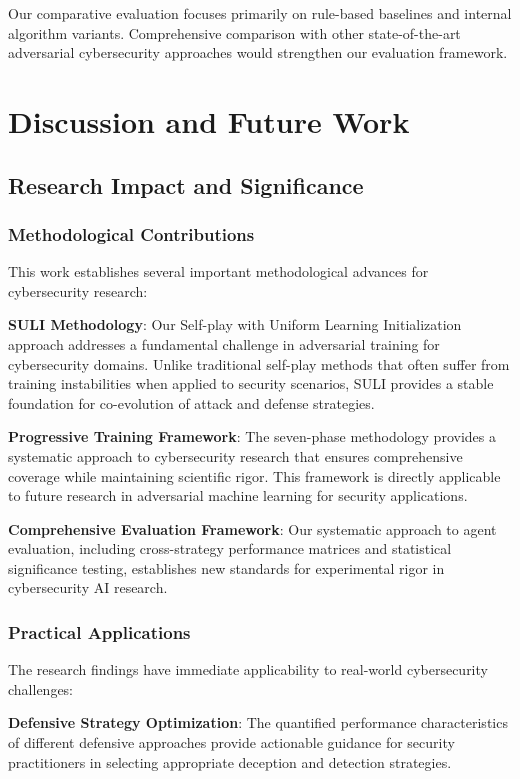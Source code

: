 \documentclass[11pt]{article}
\newcounter{phase}[algorithm]
\theoremstyle{definition}
\theoremstyle{plain}
\begin{document}
Our comparative evaluation focuses primarily on rule-based baselines and internal algorithm variants. Comprehensive comparison with other state-of-the-art adversarial cybersecurity approaches would strengthen our evaluation framework.

\section{Discussion and Future Work}

\subsection{Research Impact and Significance}

\subsubsection{Methodological Contributions}
This work establishes several important methodological advances for cybersecurity research:

\textbf{SULI Methodology}: Our Self-play with Uniform Learning Initialization approach addresses a fundamental challenge in adversarial training for cybersecurity domains. Unlike traditional self-play methods that often suffer from training instabilities when applied to security scenarios, SULI provides a stable foundation for co-evolution of attack and defense strategies.

\textbf{Progressive Training Framework}: The seven-phase methodology provides a systematic approach to cybersecurity research that ensures comprehensive coverage while maintaining scientific rigor. This framework is directly applicable to future research in adversarial machine learning for security applications.

\textbf{Comprehensive Evaluation Framework}: Our systematic approach to agent evaluation, including cross-strategy performance matrices and statistical significance testing, establishes new standards for experimental rigor in cybersecurity AI research.

\subsubsection{Practical Applications}
The research findings have immediate applicability to real-world cybersecurity challenges:

\textbf{Defensive Strategy Optimization}: The quantified performance characteristics of different defensive approaches provide actionable guidance for security practitioners in selecting appropriate deception and detection strategies.
\end{document}
